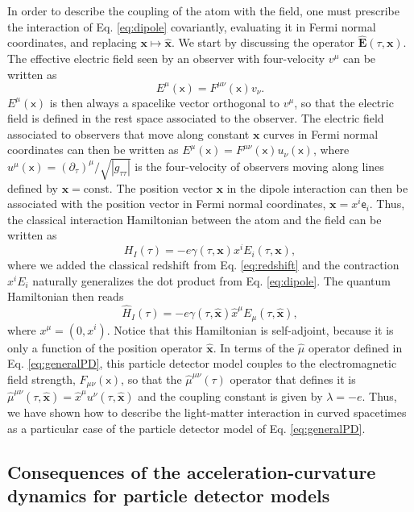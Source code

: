 \documentclass[prd,twocolumn,superscriptaddress,floatfix,amsmath,amssymb,amsfonts,longbibliography,nofootinbib]{revtex4-1}
\newcommand{\mf}{\mathsf}%
\begin{document}
In order to describe the coupling of the atom with the field, one must prescribe the interaction of Eq. \eqref{eq:dipole} covariantly, evaluating it in Fermi normal coordinates, and replacing $\bm x\longmapsto \hat{\bm x}$. We start by discussing the operator $\hat{\bm E}(\tau,\bm x)$. The effective electric field seen by an observer with four-velocity $v^\mu$ can be written as
\begin{equation}
    E^\mu(\mf x) = F^{\mu\nu}(\mf x)v_\nu.
\end{equation}
$E^\mu(\mf x)$ is then always a spacelike vector orthogonal to $v^\mu$, so that the electric field is defined in the rest space associated to the observer. The electric field associated to observers that move along constant $\bm x$ curves in Fermi normal coordinates can then be written as $E^\mu(\mf x) = F^{\mu\nu}(\mf x)u_\nu(\mf x)$, where $u^\mu(\mf x) = (\partial_\tau)^\mu/\sqrt{|g_{\tau\tau}|}$ is the four-velocity of observers moving along lines defined by $\bm x = \text{const}.$ The position vector $\bm x$ in the dipole interaction can then be associated with the position vector in Fermi normal coordinates, $\bm x = x^i \mf{e}_i$. Thus, the classical interaction Hamiltonian between the atom and the field can be written as
\begin{equation}
    {H}_I(\tau) = -e \gamma(\tau,{\bm x}){x}^i {E}_i(\tau,{\bm x}),
\end{equation}
where we added the classical redshift from Eq. \eqref{eq:redshift} and the contraction $x^i E_i$ naturally generalizes the dot product from Eq. \eqref{eq:dipole}. The quantum Hamiltonian then reads
\begin{equation}
    \hat{H}_I(\tau) = -e \gamma(\tau,\hat{\bm x})\hat{x}^\mu {E}_\mu(\tau,\hat{\bm x}),
\end{equation}
where $x^\mu = (0,x^i)$. Notice that this Hamiltonian is self-adjoint, because it is only a function of the position operator $\hat{\bm x}$. In terms of the $\hat{\mu}$ operator defined in Eq. \eqref{eq:generalPD}, this particle detector model couples to the electromagnetic field strength, $F_{\mu\nu}(\mf x)$, so that the $\hat{\mu}^{\mu\nu}(\tau)$ operator that defines it is \mbox{$\hat{\mu}^{\mu\nu}(\tau,\hat{\bm x}) = \hat{x}^\mu u^\nu(\tau,\hat{\bm x})$} and the coupling constant is given by $\lambda = - e$. Thus, we have shown how to describe the light-matter interaction in curved spacetimes as a particular case of the particle detector model of Eq. \eqref{eq:generalPD}.


\subsection{Consequences of the acceleration-curvature dynamics for particle detector models}\label{sub:consequences}
\end{document}
